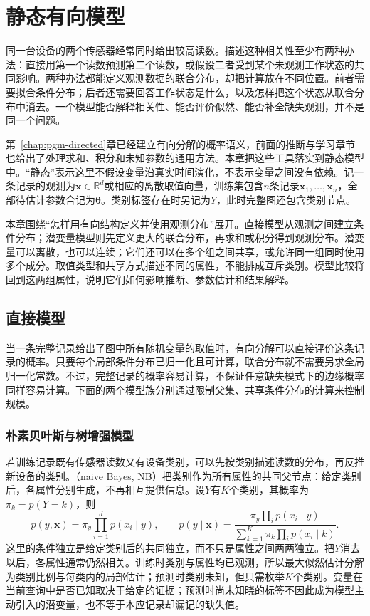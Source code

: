 \chapter{静态有向模型}
\label{chap:pgm-static-directed}

同一台设备的两个传感器经常同时给出较高读数。描述这种相关性至少有两种办法：直接用第一个读数预测第二个读数，或假设二者受到某个未观测工作状态的共同影响。两种办法都能定义观测数据的联合分布，却把计算放在不同位置。前者需要拟合条件分布；后者还需要回答工作状态是什么，以及怎样把这个状态从联合分布中消去。一个模型能否解释相关性、能否评价似然、能否补全缺失观测，并不是同一个问题。

第~\ref{chap:pgm-directed}章已经建立有向分解的概率语义，前面的推断与学习章节也给出了处理求和、积分和未知参数的通用方法。本章把这些工具落实到静态模型中。“静态”表示这里不假设变量沿真实时间演化，不表示变量之间没有依赖。记一条记录的观测为$\bm{x}\in\mathbb{R}^d$或相应的离散取值向量，训练集包含$n$条记录$\bm{x}_1,\ldots,\bm{x}_n$，全部待估计参数合记为$\bm{\theta}$。类别标签存在时另记为$Y$，此时完整图还包含类别节点。

本章围绕“怎样用有向结构定义并使用观测分布”展开。直接模型从观测之间建立条件分布；潜变量模型则先定义更大的联合分布，再求和或积分得到观测分布。潜变量可以离散，也可以连续；它们还可以在多个组之间共享，或允许同一组同时使用多个成分。取值类型和共享方式描述不同的属性，不能排成互斥类别。模型比较将回到这两组属性，说明它们如何影响推断、参数估计和结果解释。

\section{直接模型}
\label{sec:pgm-static-directed-direct}

当一条完整记录给出了图中所有随机变量的取值时，有向分解可以直接评价这条记录的概率。只要每个局部条件分布已归一化且可计算，联合分布就不需要另求全局归一化常数。不过，完整记录的概率容易计算，不保证任意缺失模式下的边缘概率同样容易计算。下面的两个模型族分别通过限制父集、共享条件分布的计算来控制规模。

\subsection{朴素贝叶斯与树增强模型}
\label{sec:pgm-static-directed-naive-tan}

若训练记录既有传感器读数又有设备类别，可以先按类别描述读数的分布，再反推新设备的类别。（naive Bayes, NB）把类别作为所有属性的共同父节点：给定类别后，各属性分别生成，不再相互提供信息。设$Y$有$K$个类别，其概率为$\pi_k=p(Y=k)$，则
\begin{equation}
  \label{eq:pgm-static-directed-naive}
  p(y,\bm{x})=\pi_y\prod_{i=1}^{d}p(x_i\mid y),\qquad
  p(y\mid\bm{x})=
  \frac{\pi_y\prod_i p(x_i\mid y)}
       {\sum_{k=1}^{K}\pi_k\prod_i p(x_i\mid k)}.
\end{equation}
这里的条件独立是给定类别后的共同独立，而不只是属性之间两两独立。把$Y$消去以后，各属性通常仍然相关。训练时类别与属性均已观测，所以最大似然估计分解为类别比例与每类内的局部估计；预测时类别未知，但只需枚举$K$个类别。变量在当前查询中是否已知取决于给定的证据；预测时尚未知晓的标签不因此成为模型主动引入的潜变量，也不等于本应记录却漏记的缺失值。

